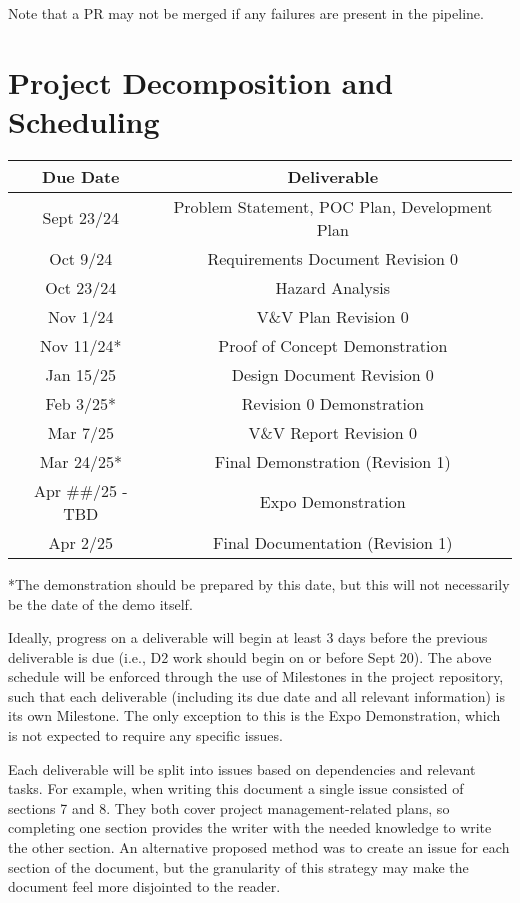 \documentclass{article}
\begin{document}
Note that a PR may not be merged if any failures are present in the pipeline.

\section{Project Decomposition and Scheduling}

\begin{center}
  \begin{tabular}{ |c|c| } 
    \hline
      \textbf{Due Date} & \textbf{Deliverable} \\
    \hline
      Sept 23/24 & Problem Statement, POC Plan, Development Plan \\
    \hline
      Oct 9/24 & Requirements Document Revision 0 \\
    \hline
      Oct 23/24 & Hazard Analysis \\
    \hline
      Nov 1/24 & V\&V Plan Revision 0 \\
    \hline
      Nov 11/24* & Proof of Concept Demonstration \\
    \hline
      Jan 15/25 & Design Document Revision 0 \\
    \hline
      Feb 3/25* & Revision 0 Demonstration \\
    \hline
      Mar 7/25 & V\&V Report Revision 0 \\
    \hline
      Mar 24/25* & Final Demonstration (Revision 1) \\
    \hline
      Apr \#\#/25 - TBD & Expo Demonstration \\
    \hline
      Apr 2/25 & Final Documentation (Revision 1) \\
    \hline
  \end{tabular}
\end{center}
*The demonstration should be prepared by this date, but this will not necessarily be the date of the demo itself.

Ideally, progress on a deliverable will begin at least 3 days before the previous deliverable is due (i.e., D2 work should begin on or before Sept 20). The above schedule will be enforced through the use of Milestones in the project repository, such that each deliverable (including its due date and all relevant information) is its own Milestone.
The only exception to this is the Expo Demonstration, which is not expected to require any specific issues.

Each deliverable will be split into issues based on dependencies and relevant tasks. For example, when writing this document a single issue consisted of sections 7 and 8. They both cover project management-related plans, so completing one section provides the writer with the needed knowledge to write the other section. An alternative proposed method was to create an issue for each section of the document, but the granularity of this strategy may make the document feel more disjointed to the reader.
\end{document}
